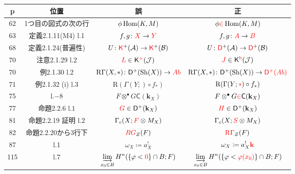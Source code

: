 \begin{table}[h]\centering
\begin{tabular}{|c|c|c|c|}
    \hline
    \rowcolor{lightgray}p&位置 & 誤 & 正 \\
    \hline
    62&1つ目の図式の次の行
    &\(\phi\Hom(K,M)\)
    &\(\phi\textcolor{red}{\in}\Hom(K,M)\)
    \\\hline
    63&定義2.1.11(M4) l.1
    &\(f,g\colon\textcolor{red}{X}\to\textcolor{red}{Y}\)
    &\(f,g\colon\textcolor{red}{A}\to\textcolor{red}{B}\)
    \\\hline
    68&定義2.1.24(普遍性)
    &\(U\colon\textcolor{red}{\mathsf{K}}^+(\mathcal{A})\to\textcolor{red}{\mathsf{K}}^+(\mathcal{B})\)
    &\(U\colon\textcolor{red}{\mathsf{D}}^+(\mathcal{A})\to\textcolor{red}{\mathsf{D}}^+(\mathcal{B})\)
    \\\hline
    70&注意2.1.29 l.2
    &\(\textcolor{red}{L}\in\mathsf{K}^{\textcolor{red}{+}}(\mathcal{J})\)
    &\(\textcolor{red}{J}\in\mathsf{K}^{\textcolor{red}{\mathrm{b}}}(\mathcal{J})\)\footnotemark[1]
    \\\hline
    70&例2.1.30 l.2
    &\(\RG(X,\ast)\colon\mathsf{D}^+(\Sh(X))\to \textcolor{red}{Ab}\)
    &\(\RG(X,\ast)\colon\mathsf{D}^+(\Sh(X))\to \textcolor{red}{\mathsf{D}^+(Ab)}\)
    \\\hline
    71&例2.1.32 (i) l.3
    &\(\mathrm{R}(\Gamma(Y;)\circ{f_\ast})\)
    &\(\mathrm{R}(\Gamma(Y;\textcolor{red}{\ast})\circ{f_\ast})\)
    \\\hline
    75&l.\(-8\)
    &\(F\otimes^\bullet G\mathsf{C}(\mathbf{k}_X)\)
    &\(F\otimes^\bullet G\textcolor{red}{\in}\mathsf{C}(\mathbf{k}_X)\)
    \\\hline
    77&命題2.2.6 l.\(1\)
    &\(\textcolor{red}{G}\in\mathsf{D}^+(\mathbf{k}_X)\)
    &\(\textcolor{red}{H}\in\mathsf{D}^+(\mathbf{k}_X)\)
    \\\hline
    81&命題2.2.19 証明 l.\(2\)
    &\(\Gamma_c(X;\textcolor{red}{F}\otimes M_X)\)
    &\(\Gamma_c(X;\textcolor{red}{S}\otimes M_X)\)
    \\\hline
    82&命題2.2.20から3行下
    &\(\textcolor{red}{RG}_Z(F)\)
    &\(\textcolor{red}{\RG}_Z(F)\)
    \\\hline
    87&l.1
    &\(\omega_X\coloneqq a_X^!\)
    &\(\omega_X\coloneqq a_X^!\textcolor{red}{\textbf{k}}\)
    \\\hline    
    115&l.7
    &\(\dip \indlim[x_0\in{B}]H^n(\{\varphi<\textcolor{red}{0}\}\cap{B};F)\)
    &\(\dip \indlim[x_0\in{B}]H^n(\{\varphi<\textcolor{red}{\varphi(x_0)}\}\cap{B};F)\)
    \\\hline
\end{tabular}
\end{table}




